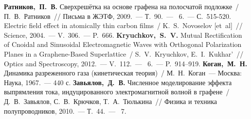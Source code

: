 \begin{thebibliography}{99}
       \textbf{Ратников,~П.~В.} Сверхрешётка на основе графена на полосчатой подложке~/ П.~В.~Ратников~// Письма в ЖЭТФ, 2009.~--- Т.~90.~--- \No~6.~--- С.~515-520.
     Electric field effect in atomically thin carbon films~/ K.~S.~Novoselov [et~al]~// Science, 2004.~--- V.~306.~--- P.~666.
     \textbf{Kryuchkov,~S.~V.} Mutual Rectification of Cnoidal and Sinusoidal Electro\-magnetic Waves with Orthogonal Polarization Planes in a Graphene-Based Superlattice~/ S.~V.~Kryuchkov, E.~I.~Kukhar’~// Optics and Spectroscopy, 2012.~--- V.~112.~--- \No~6.~--- P.~914--919.
       \textbf{Коган,~М.~Н.} Динамика разреженного газа (кинетическая теория)~/ М.~Н.~Коган~--- Москва: Наука, 1967.~--- 440 с.
     \textbf{Завьялов,~Д.~В.} Численное моделирование эффекта выпрямления тока, индуцированного электромагнитной волной в графене~/ Д.~В.~Завьялов, С.~В.~Крючков, Т.~А.~Тюлькина~// Физика и техника полупроводников, 2010.~--- Т.~44.~--- \No~7.
\end{thebibliography}

